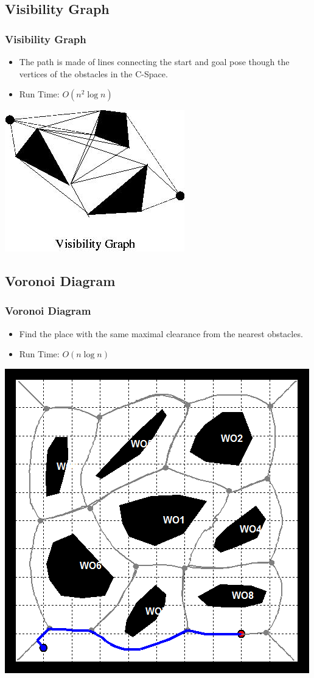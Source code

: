 \documentclass{beamer}
\begin{document}
\subsection{Visibility Graph}
\begin{frame}
\frametitle{Visibility Graph}
\begin{itemize}
\item The path is made of lines connecting the start and goal pose though the vertices of the obstacles in the C-Space.
\item Run Time: $O(n^2\log{n})$
\end{itemize}
\centering
 \includegraphics[width=.45\textwidth]{figures/visibilitygraph.jpg}\\

\end{frame}
\subsection{Voronoi Diagram}
\begin{frame}
\frametitle{Voronoi Diagram}
\begin{itemize}
\item Find the place with the same maximal clearance from the nearest obstacles.
\item Run Time: $O(n\log{n})$
\end{itemize}
\centering
 \includegraphics[width=.35\textwidth]{figures/voronoi.png}\\

\end{frame}
\end{document}
